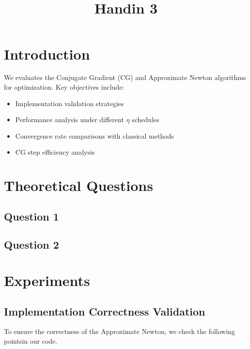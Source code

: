 \documentclass[12pt]{article}
\title{Handin 3}
\begin{document}
\maketitle

\section{Introduction}


We evaluates the Conjugate Gradient (CG) and Approximate Newton algorithms for optimization. Key objectives include:
\begin{itemize}
    \item Implementation validation strategies
    \item Performance analysis under different $\eta$ schedules
    \item Convergence rate comparisons with classical methods
    \item CG step efficiency analysis
\end{itemize}


\section{Theoretical Questions}
\subsection{Question 1}

\subsection{Question 2}


\section{Experiments}

\subsection{Implementation Correctness Validation}

To ensure the correctness of the Approximate Newton, we check the following pointsin our code.
\end{document}

